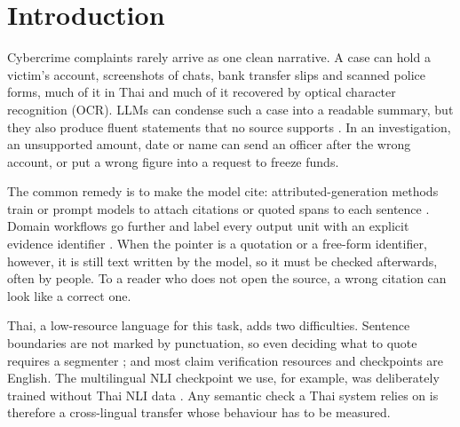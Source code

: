 \documentclass[runningheads]{llncs}
\begin{document}
\section{Introduction}

Cybercrime complaints rarely arrive as one clean narrative. A case can hold a victim's
account, screenshots of chats, bank transfer slips and scanned police forms, much of it in Thai
and much of it recovered by optical character recognition (OCR). LLMs can condense such a case
into a readable summary, but they also produce fluent statements that no source supports
\cite{ji2023hallucination}. In an investigation, an unsupported amount, date or name can send an
officer after the wrong account, or put a wrong figure into a request to freeze funds.

The common remedy is to make the model cite: attributed-generation methods train or
prompt models to attach citations or quoted spans to each sentence
\cite{gao2023alce,slobodkin2024afg}. Domain workflows go further and label every output unit
with an explicit evidence identifier \cite{yang2026traceable}. When the pointer is a quotation or a
free-form identifier, however, it is still text written by the model, so it must be checked
afterwards, often by people. To a reader who does not open the source, a wrong citation can look like a correct one.

Thai, a low-resource language for this task, adds two difficulties. Sentence boundaries are not marked by punctuation, so even deciding
what to quote requires a segmenter \cite{phatthiyaphaibun2023pythainlp}; and most claim
verification resources and checkpoints are English. The multilingual NLI checkpoint we use, for
example, was deliberately trained without Thai NLI data \cite{laurer2022mdeberta}. Any semantic
check a Thai system relies on is therefore a cross-lingual transfer whose behaviour has to be
measured.
\end{document}
